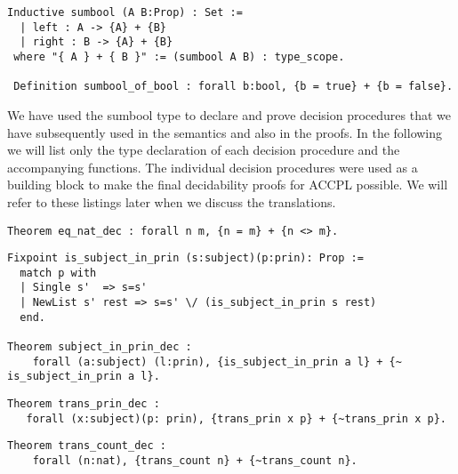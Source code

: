 \begin{minipage}[c]{0.95\textwidth}
\begin{lstlisting}
Inductive sumbool (A B:Prop) : Set :=
  | left : A -> {A} + {B}
  | right : B -> {A} + {B}
 where "{ A } + { B }" := (sumbool A B) : type_scope.
 
 Definition sumbool_of_bool : forall b:bool, {b = true} + {b = false}.
\end{lstlisting}
\end{minipage}

We have used the sumbool type to declare and prove decision procedures that we have subsequently used in the semantics and also in the proofs. In the following we will list only the type declaration of each decision procedure and the accompanying functions. The individual decision procedures were used as a building block to make the final decidability proofs for \ac{ACCPL} possible. We will refer to these listings later when we discuss the translations.

\begin{lstlisting}
Theorem eq_nat_dec : forall n m, {n = m} + {n <> m}.
\end{lstlisting}


\begin{lstlisting}
Fixpoint is_subject_in_prin (s:subject)(p:prin): Prop :=
  match p with
  | Single s'  => s=s'
  | NewList s' rest => s=s' \/ (is_subject_in_prin s rest)
  end.

Theorem subject_in_prin_dec :
    forall (a:subject) (l:prin), {is_subject_in_prin a l} + {~ is_subject_in_prin a l}.

\end{lstlisting}

\begin{lstlisting}
Theorem trans_prin_dec :
   forall (x:subject)(p: prin), {trans_prin x p} + {~trans_prin x p}.
\end{lstlisting}

\begin{lstlisting}
Theorem trans_count_dec :
    forall (n:nat), {trans_count n} + {~trans_count n}.
\end{lstlisting}

